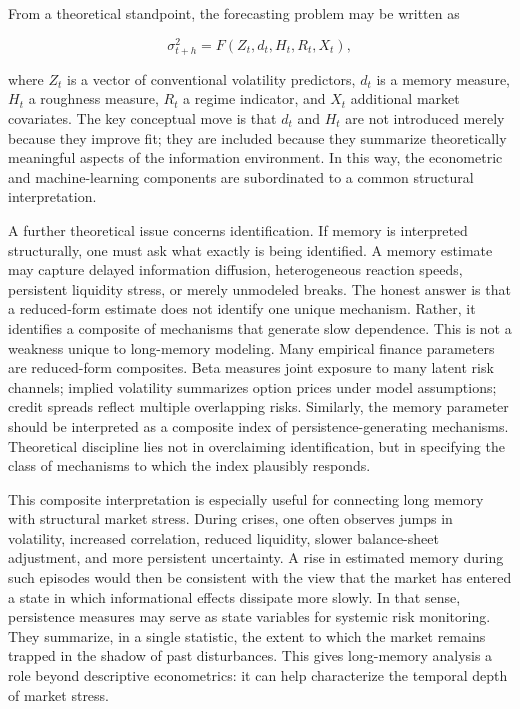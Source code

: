 \documentclass[12pt]{article}
\begin{document}
From a theoretical standpoint, the forecasting problem may be written as

\[\sigma_{t+h}^2 = F(Z_t, d_t, H_t, R_t, X_t),\]

where $Z_t$ is a vector of conventional volatility predictors, $d_t$ is a memory measure, $H_t$ a roughness measure, $R_t$ a regime indicator, and $X_t$ additional market covariates. The key conceptual move is that $d_t$ and $H_t$ are not introduced merely because they improve fit; they are included because they summarize theoretically meaningful aspects of the information environment. In this way, the econometric and machine-learning components are subordinated to a common structural interpretation.

A further theoretical issue concerns identification. If memory is interpreted structurally, one must ask what exactly is being identified. A memory estimate may capture delayed information diffusion, heterogeneous reaction speeds, persistent liquidity stress, or merely unmodeled breaks. The honest answer is that a reduced-form estimate does not identify one unique mechanism. Rather, it identifies a composite of mechanisms that generate slow dependence. This is not a weakness unique to long-memory modeling. Many empirical finance parameters are reduced-form composites. Beta measures joint exposure to many latent risk channels; implied volatility summarizes option prices under model assumptions; credit spreads reflect multiple overlapping risks. Similarly, the memory parameter should be interpreted as a composite index of persistence-generating mechanisms. Theoretical discipline lies not in overclaiming identification, but in specifying the class of mechanisms to which the index plausibly responds.

This composite interpretation is especially useful for connecting long memory with structural market stress. During crises, one often observes jumps in volatility, increased correlation, reduced liquidity, slower balance-sheet adjustment, and more persistent uncertainty. A rise in estimated memory during such episodes would then be consistent with the view that the market has entered a state in which informational effects dissipate more slowly. In that sense, persistence measures may serve as state variables for systemic risk monitoring. They summarize, in a single statistic, the extent to which the market remains trapped in the shadow of past disturbances. This gives long-memory analysis a role beyond descriptive econometrics: it can help characterize the temporal depth of market stress.
\end{document}
